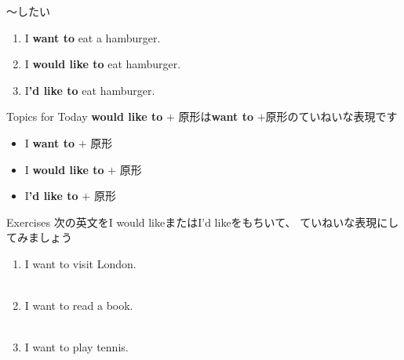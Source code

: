 \documentclass[aspectratio=169,xcolor={dvipsnames,table}]{beamer}
\begin{document}
\begin{frame}[plain]{～したい}
\large
 \begin{enumerate}
  \item I \textbf{want to} eat a hamburger.
  \item I \textbf{would like to} eat hamburger.
  \item I{\bfseries 'd like to} eat hamburger.
 \end{enumerate}

\begin{block}{Topics for Today}\small
\textbf{would like to} $+$ 原形は\textbf{want to} $+$原形のていねいな表現です
\begin{itemize}[square]\small
 \item I \textbf{want to} $+$ 原形
 \item I \textbf{would like to} $+$ 原形
 \item I\textbf{'d like to} $+$ 原形
       \end{itemize}
\end{block}

\hfill{\scriptsize {}}

\end{frame}
\begin{frame}[plain]{Exercises}
次の英文をI would likeまたはI'd likeをもちいて、 ていねいな表現にしてみましょう
 \begin{enumerate}
  \item I want to visit London.\\
\\
  \item I want to read a book.\\
\\
  \item I want to play tennis.\\
\\
 \end{enumerate}
\hfill{\scriptsize {}}

\end{frame}
\end{document}
